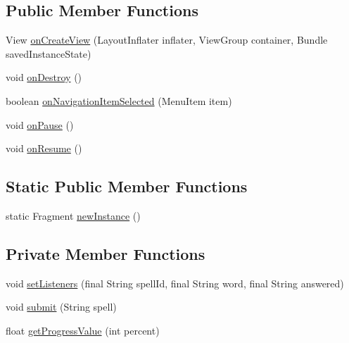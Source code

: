\subsection*{Public Member Functions}
\begin{DoxyCompactItemize}
\item 
View \hyperlink{classorg_1_1buildmlearn_1_1toolkit_1_1learnspelling_1_1fragment_1_1MainFragment_abefc3ebf347bc9d8f4452b9c2729e59a}{on\+Create\+View} (Layout\+Inflater inflater, View\+Group container, Bundle saved\+Instance\+State)
\item 
void \hyperlink{classorg_1_1buildmlearn_1_1toolkit_1_1learnspelling_1_1fragment_1_1MainFragment_a3829611c436d88dae1b2aaf33e1880db}{on\+Destroy} ()
\item 
boolean \hyperlink{classorg_1_1buildmlearn_1_1toolkit_1_1learnspelling_1_1fragment_1_1MainFragment_a897d452d8639234d894c83599ef70452}{on\+Navigation\+Item\+Selected} (Menu\+Item item)
\item 
void \hyperlink{classorg_1_1buildmlearn_1_1toolkit_1_1learnspelling_1_1fragment_1_1MainFragment_a68e3560db5a2a51f3e6dec29642d1e6d}{on\+Pause} ()
\item 
void \hyperlink{classorg_1_1buildmlearn_1_1toolkit_1_1learnspelling_1_1fragment_1_1MainFragment_a8ad534416b5a19a314b3ef9b0c0fda31}{on\+Resume} ()
\end{DoxyCompactItemize}
\subsection*{Static Public Member Functions}
\begin{DoxyCompactItemize}
\item 
static Fragment \hyperlink{classorg_1_1buildmlearn_1_1toolkit_1_1learnspelling_1_1fragment_1_1MainFragment_aea596fc1f0214e93efc0e561783390ec}{new\+Instance} ()
\end{DoxyCompactItemize}
\subsection*{Private Member Functions}
\begin{DoxyCompactItemize}
\item 
void \hyperlink{classorg_1_1buildmlearn_1_1toolkit_1_1learnspelling_1_1fragment_1_1MainFragment_a6c95a87952a371c75552bba576679d1d}{set\+Listeners} (final String spell\+Id, final String word, final String answered)
\item 
void \hyperlink{classorg_1_1buildmlearn_1_1toolkit_1_1learnspelling_1_1fragment_1_1MainFragment_a5dd9a9e0d11a8f3fd85b818b15deeb2f}{submit} (String spell)
\item 
float \hyperlink{classorg_1_1buildmlearn_1_1toolkit_1_1learnspelling_1_1fragment_1_1MainFragment_a97484fabbe4d7c04a641e52662b49e6e}{get\+Progress\+Value} (int percent)
\end{DoxyCompactItemize}

